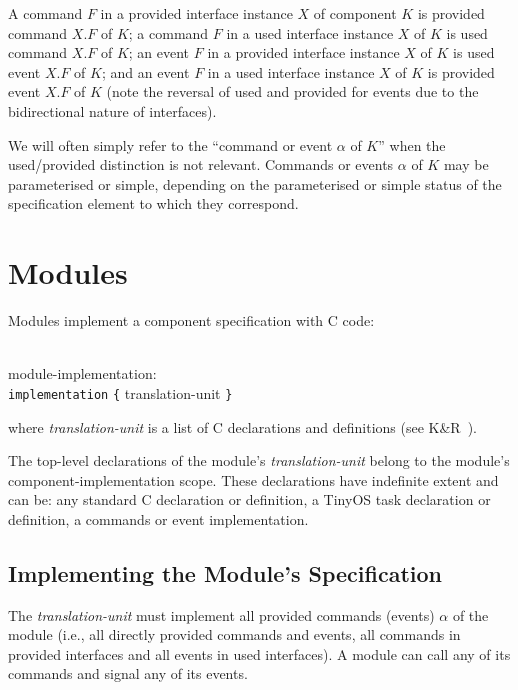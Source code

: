 \documentclass[11pt]{article}
\newcommand{\kw}[1]{{\tt #1}}
\begin{document}
A command $F$ in a provided interface instance $X$ of component $K$ is
provided command $X.F$ of $K$; a command $F$ in a used interface instance
$X$ of $K$ is used command $X.F$ of $K$; an event $F$ in a provided
interface instance $X$ of $K$ is used event $X.F$ of $K$; and an event $F$
in a used interface instance $X$ of $K$ is provided event $X.F$ of $K$
(note the reversal of used and provided for events due to the bidirectional
nature of interfaces). 

We will often simply refer to the ``command or event $\alpha$ of $K$'' when
the used/provided distinction is not relevant.  Commands or events $\alpha$
of $K$ may be parameterised or simple, depending on the parameterised or
simple status of the specification element to which they correspond.

\section{Modules}
\label{sec:module}

Modules implement a component specification with C code:
\em \begin{tabbing}
\hspace*{2cm}\= \\ \kill
module-implementation:\\
\>	\kw{implementation} \kw{\{} translation-unit \kw{\}}\\
\end{tabbing} \rm
where \emph{translation-unit} is a list of C declarations and definitions
(see K\&R~\cite[pp234--239]{kandr}). 

The top-level declarations of the module's \emph{translation-unit} belong
to the module's component-implementation scope. These declarations have
indefinite extent and can be: any standard C declaration or definition, a
TinyOS task declaration or definition, a commands or event
implementation.

\subsection{Implementing the Module's Specification}

The \emph{translation-unit} must implement all provided commands
(events) $\alpha$ of the module (i.e., all directly provided commands and
events, all commands in provided interfaces and all events in used
interfaces). A module can call any of its commands and signal any of its
events.
\end{document}
